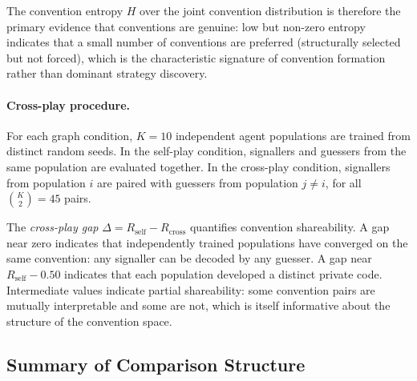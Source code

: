 \documentclass[a4paper,twoside,12pt]{report}
\begin{document}
    
    The convention entropy $H$ over the joint convention distribution is
    therefore the primary evidence that conventions are genuine: low but
    non-zero entropy indicates that a small number of conventions are
    preferred (structurally selected but not forced), which is the
    characteristic signature of convention formation rather than dominant
    strategy discovery.
    
    \paragraph{Cross-play procedure.}
    For each graph condition, $K = 10$ independent agent populations are
    trained from distinct random seeds. In the self-play condition,
    signallers and guessers from the same population are evaluated together.
    In the cross-play condition, signallers from population $i$ are paired
    with guessers from population $j \neq i$, for all $\binom{K}{2} = 45$
    pairs.
    
    The \emph{cross-play gap} $\Delta = R_{\mathrm{self}} -
    R_{\mathrm{cross}}$ quantifies convention shareability. A gap near zero
    indicates that independently trained populations have converged on the
    same convention: any signaller can be decoded by any guesser. A gap near
    $R_{\mathrm{self}} - 0.50$ indicates that each population developed a
    distinct private code. Intermediate values indicate partial shareability:
    some convention pairs are mutually interpretable and some are not, which
    is itself informative about the structure of the convention space.
    
    
    
    \subsection{Summary of Comparison Structure}
     
\end{document}
